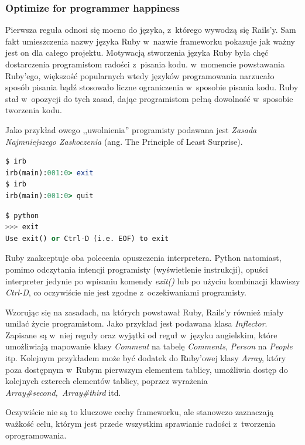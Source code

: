\documentclass[mgr,oneside]{mgr}
\begin{document}
\subsubsection{Optimize for programmer happiness}
Pierwsza reguła odnosi się mocno do języka, z~którego wywodzą się Rails'y. Sam fakt umieszczenia nazwy języka Ruby w~nazwie frameworku pokazuje jak ważny jest on dla całego projektu. Motywacją stworzenia języka Ruby była chęć dostarczenia programistom radości z~pisania kodu. w~momencie powstawania Ruby'ego, większość popularnych wtedy języków programowania narzucało sposób pisania bądź stosowało liczne ograniczenia w~sposobie pisania kodu. Ruby stał w~opozycji do tych zasad, dając programistom pełną dowolność w~sposobie tworzenia kodu.

Jako przykład owego ,,uwolnienia'' programisty podawana jest \emph{Zasada Najmniejszego Zaskoczenia} (ang. The Principle of Least Surprise).
\begin{lstlisting}[caption={Wyjście z~interpretera Ruby'ego.},language=Ruby]
$ irb
irb(main):001:0> exit
$ irb
irb(main):001:0> quit
\end{lstlisting}

\begin{lstlisting}[caption={Wyjście z~interpretera Python'a.},language=Python]
$ python
>>> exit
Use exit() or Ctrl-D (i.e. EOF) to exit
\end{lstlisting}
Ruby zaakceptuje oba polecenia opuszczenia interpretera. Python natomiast, pomimo odczytania intencji programisty (wyświetlenie instrukcji), opuści interpreter jedynie po wpisaniu komendy \emph{exit()} lub po użyciu kombinacji klawiszy \emph{Ctrl-D}, co oczywiście nie jest zgodne z~oczekiwaniami programisty.

Wzorując się na zasadach, na których powstawał Ruby, Rails'y również miały umilać życie programistom. Jako przykład jest podawana klasa \emph{Inflector}. Zapisane są w~niej reguły oraz wyjątki od reguł w~języku angielskim, które umożliwiają mapowanie klasy \emph{Comment} na tabelę \emph{Comments}, \emph{Person} na \emph{People} itp. Kolejnym przykładem może być dodatek do Ruby'owej klasy \emph{Array}, który poza dostępnym w~Rubym pierwszym elementem tablicy, umożliwia dostęp do kolejnych czterech elementów tablicy, poprzez wyrażenia \emph{Array\#second,~Array\#third} itd.

Oczywiście nie są to kluczowe cechy frameworku, ale stanowczo zaznaczają ważkość celu, którym jest przede wszystkim sprawianie radości z~tworzenia oprogramowania.
\end{document}
